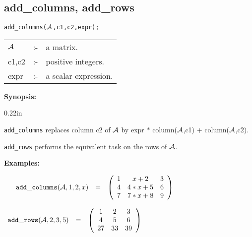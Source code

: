\subsection{add\_columns, add\_rows}


\hspace*{0.175in} {\tt add\_columns(${\cal A}$,c1,c2,expr);} 

\hspace*{0.1in}
\begin{tabular}{l l l}
${\cal A}$ & :- & a matrix. \\
c1,c2      & :- & positive integers. \\
expr       & :- & a scalar expression. 
\end{tabular}

{\bf Synopsis:} %

\begin{addtolength}{\leftskip}{0.22in}
\parbox[t]{0.95\linewidth}{{\tt add\_columns} replaces column c2 of 
${\cal A}$ by expr $*$ column(${\cal A}$,c1) $+$ column(${\cal A}$,c2).}

{\tt add\_rows} performs the equivalent task on the rows of ${\cal A}$.

\end{addtolength}

{\bf Examples:}

\begin{flushleft}
\begin{math}
\hspace*{0.16in}
\begin{array}{ccc}
{\tt add\_columns}({\cal A},1,2,x) & = & 
\left( \begin{array}{ccc} 1 & x+2 & 3 \\ 4 & 4*x+5 & 6 \\ 7 & 7*x+8 & 9
\end{array} \right)  
\end{array}
\end{math}
\end{flushleft}

\vspace*{0.1in}

\begin{flushleft}
\hspace*{0.1in}
\begin{math}
\begin{array}{ccc}
{\tt add\_rows}({\cal A},2,3,5) & = & 
\left( \begin{array}{ccc} 1 & 2 & 3 \\ 4 & 5 & 6 \\ 27 & 33 & 39 
\end{array} \right)  
\end{array}
\end{math}
\end{flushleft}

